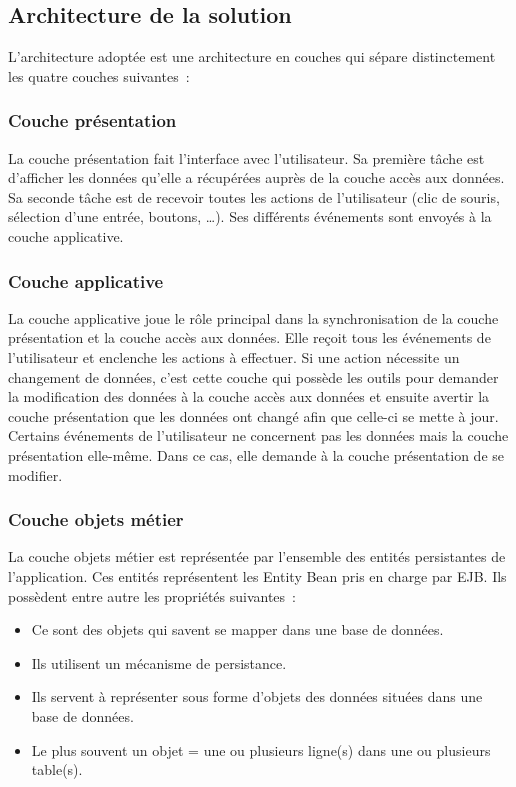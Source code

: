 \documentclass[a4paper, titlepage]{report}
\let\oldparagraph\subsubsection
\renewcommand{\subsubsection}[1]{\oldparagraph{#1}\mbox{}}
\begin{document}
\subsection{Architecture de la solution}

L'architecture adoptée est une architecture en couches qui sépare
distinctement les quatre couches suivantes~:

\subsubsection{Couche présentation}\label{couche-presentation}

La couche présentation fait l'interface avec l'utilisateur. Sa première
tâche est d'afficher les données qu'elle a récupérées auprès de la
couche accès aux données. Sa seconde tâche est de recevoir toutes les
actions de l'utilisateur (clic de souris, sélection d'une entrée,
boutons, \ldots{}). Ses différents événements sont envoyés à la couche
applicative.

\subsubsection{Couche applicative}\label{couche applicative}

La couche applicative joue le rôle principal dans la synchronisation de
la couche présentation et la couche accès aux données. Elle reçoit tous
les événements de l'utilisateur et enclenche les actions à effectuer. Si
une action nécessite un changement de données, c'est cette couche qui
possède les outils pour demander la modification des données à la couche
accès aux données et ensuite avertir la couche présentation que les
données ont changé afin que celle-ci se mette à jour. Certains
événements de l'utilisateur ne concernent pas les données mais la couche
présentation elle-même. Dans ce cas, elle demande à la couche
présentation de se modifier.

\subsubsection{Couche objets métier}\label{couche-objets-muxe9tier}

La couche objets métier est représentée par l'ensemble des entités
persistantes de l'application. Ces entités représentent les Entity Bean
pris en charge par EJB. Ils possèdent entre autre les propriétés
suivantes~:
\begin{itemize}
\item Ce sont des objets qui savent se mapper dans une base de
données.
\item Ils utilisent un mécanisme de persistance.
\item Ils servent à
représenter sous forme d'objets des données situées dans une base de
données.
\item Le plus souvent un objet = une ou plusieurs ligne(s) dans une
ou plusieurs table(s).
\end{itemize}
\end{document}
